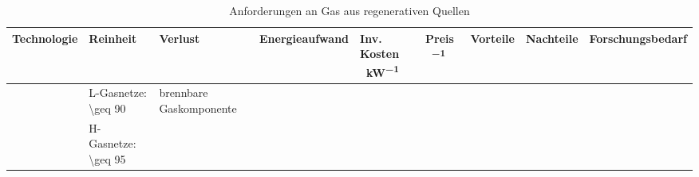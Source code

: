 
{
\renewcommand{\arraystretch}{1.1}
\begin{table}[H]
	\begin{center}
		\caption{Anforderungen an Gas aus regenerativen Quellen \parencite{FNR14}\parencite{KoBi16}}
		\begin{tabu} to 0.5\textwidth {| X | X | X | X | X | X | X | X | X |}
\hline
Technologie 			&  Reinheit 				&  Verlust 		& 
Energieaufwand 			& Inv. Kosten \si{\sieuro\per\kW} 	& Preis \si{\sieuro\per\normvol} & 
Vorteile 				& Nachteile 						& Forschungsbedarf		\\		
\hline
			 &	L-Gasnetze: \SI{\geq 90}{\Molpercent}  &	brennbare Gaskomponente	\\
					 &	H-Gasnetze: \SI{\geq 95}{\Molpercent}	&	{}							\\ 
\hline

			
		\end{tabu}
		\label{tab:tab_TechComp}
	\end{center}
\end{table}
}